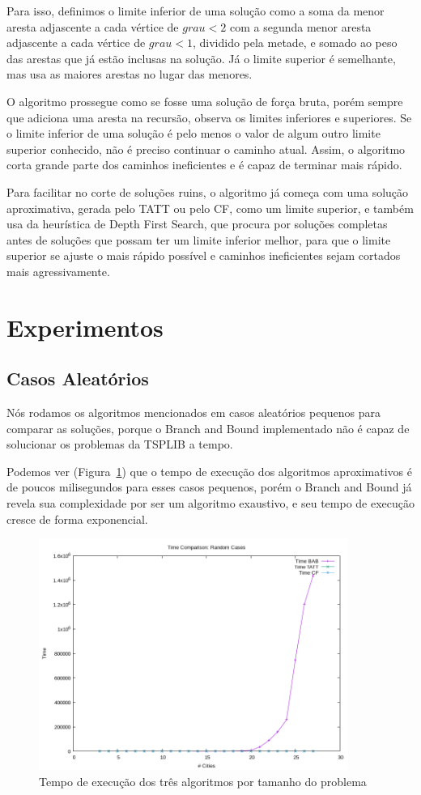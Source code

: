 \documentclass[12pt]{article}
\begin{document}
Para isso, definimos o limite inferior de uma solução como a soma da menor
aresta adjascente a cada vértice de $grau<2$ com a segunda menor aresta adjascente
a cada vértice de $grau<1$, dividido pela metade, e somado ao peso das arestas
que já estão inclusas na solução. Já o limite superior é semelhante, mas usa
as maiores arestas no lugar das menores.

O algoritmo prossegue como se fosse uma solução de força bruta, porém sempre
que adiciona uma aresta na recursão, observa os limites inferiores e superiores.
Se o limite inferior de uma solução é pelo menos o valor de algum outro limite
superior conhecido, não é preciso continuar o caminho atual. Assim, o algoritmo
corta grande parte dos caminhos ineficientes e é capaz de terminar mais rápido.

Para facilitar no corte de soluções ruins, o algoritmo já começa com uma solução
aproximativa, gerada pelo TATT ou pelo CF, como um limite superior, e também usa
da heurística de Depth First Search, que procura por soluções completas antes de
soluções que possam ter um limite inferior melhor, para que o limite superior
se ajuste o mais rápido possível e caminhos ineficientes sejam cortados mais
agressivamente.

\section{Experimentos}
\subsection{Casos Aleatórios}
Nós rodamos os algoritmos mencionados em casos aleatórios pequenos para comparar
as soluções, porque o Branch and Bound implementado não é capaz de solucionar
os problemas da TSPLIB a tempo.

Podemos ver (Figura~\ref{fig:randomTimes}) que o tempo de execução dos algoritmos aproximativos é de poucos
milisegundos para esses casos pequenos, porém o Branch and Bound já revela
sua complexidade por ser um algoritmo exaustivo, e seu tempo de execução
cresce de forma exponencial.

\begin{figure}
\centering
\includegraphics[width=0.9\textwidth]{random_plot_times.png}
\caption{Tempo de execução dos três algoritmos por tamanho do problema}
\label{fig:randomTimes}
\end{figure}
\end{document}
